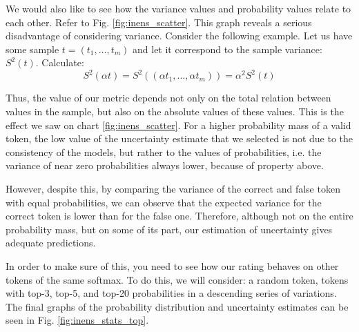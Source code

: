 \documentclass[a4paper,14pt]{extarticle}
\begin{document}
	We would also like to see how the variance values and probability values relate to each other. Refer to Fig. \ref{fig:inens_scatter}. This graph reveals a serious disadvantage of considering variance. Consider the following example. Let us have some sample $t = (t_1, \dots, t_m)$ and let it correspond to the sample variance: $S^2 (t)$. Calculate:
	\begin{equation*}
		S^2(\alpha t) = S^2((\alpha t_1, \dots, \alpha t_m)) = \alpha^2 S^2(t)
	\end{equation*}
	
	Thus, the value of our metric depends not only on the total relation between values in the sample, but also on the absolute values of these values. This is the effect we saw on chart \ref{fig:inens_scatter}. For a higher probability mass of a valid token, the low value of the uncertainty estimate that we selected is not due to the consistency of the models, but rather to the values of probabilities, i.e. the variance of near zero probabilities always lower, because of property above.

	However, despite this, by comparing the variance of the correct and false token with equal probabilities, we can observe that the expected variance for the correct token is lower than for the false one. Therefore, although not on the entire probability mass, but on some of its part, our estimation of uncertainty gives adequate predictions.
	
	\begin{figure}[H]
	\end{figure}

	In order to make sure of this, you need to see how our rating behaves on other tokens of the same softmax. To do this, we will consider: a random token, tokens with top-3, top-5, and top-20 probabilities in a descending series of variations. The final graphs of the probability distribution and uncertainty estimates can be seen in Fig. \ref{fig:inens_stats_top}.
	
\end{document}
